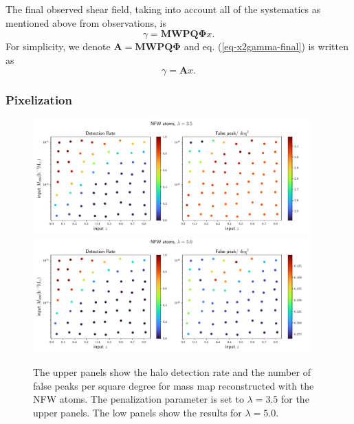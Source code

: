 \documentclass[twocolumn]{aastex62}
\begin{document}
The final observed shear field, taking into account all of the systematics as
mentioned above from observations, is
\begin{equation}\label{eq-x2gamma-final}
\gamma =\mathbf{M} \mathbf{W} \mathbf{P} \mathbf{Q} \mathbf{\Phi} x.
\end{equation}
For simplicity, we denote $\mathbf{A}=\mathbf{M} \mathbf{W} \mathbf{P}
\mathbf{Q} \mathbf{\Phi} $ and
eq. (\ref{eq-x2gamma-final}) is written as
\begin{equation}\label{eq-x2gamma-simple}
\gamma=\mathbf{A} x.
\end{equation}

\subsubsection{Pixelization}
\label{subsec:method-pixel}

\begin{figure}[!t]
 \centering
 \includegraphics[width=0.95\textwidth]{detfalseRate_f3-1.pdf}
 \includegraphics[width=0.95\textwidth]{detfalseRate_f3-3.pdf}
 \caption{The upper panels show the halo detection rate and the number of false
     peaks per square degree for mass map reconstructed with the NFW atoms. The
     penalization parameter is set to $\lambda=3.5$ for the upper panels.  The
     low panels show the results for $\lambda=5.0$.
        } \label{fig-detFalsRateNFW}
\end{figure}
\end{document}
